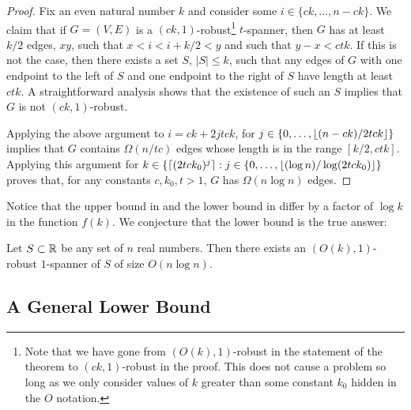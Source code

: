 \documentclass{patmorin}
\begin{document}
\begin{proof}
Fix an even natural number $k$ and consider some $i\in\{ck,\ldots,n-ck\}$.
We claim that if $G=(V,E)$ is a $(ck,1)$-robust\footnote{Note that we
have gone from $(O(k),1)$-robust in the statement of the theorem to
$(ck,1)$-robust in the proof.  This does not cause a problem so long
as we only consider values of $k$ greater than some constant $k_0$
hidden in the $O$ notation.} $t$-spanner, then $G$ has at least $k/2$
edges, $xy$, such that $x < i < i+k/2 < y$ and such that $y-x < ctk$.
If this is not the case, then there exists a set $S$, $|S|\le k$,
such that any edges of $G$ with one endpoint to the left of $S$
and one endpoint to the right of $S$ have length at least $ctk$.
A straightforward analysis shows that the existence of such an $S$
implies that $G$ is not $(ck,1)$-robust.

Applying the above argument to $i=ck+2jtck$, for
$j\in\{0,\ldots,{\lfloor (n-ck)/2tck \rfloor}\}$ implies that $G$ contains
$\Omega(n/tc)$ edges whose length is in the range $[k/2,ctk]$.  Applying
this argument for $k\in\{{\lceil (2tck_0)^{j} \rceil} : j\in\{0,\ldots,{\lfloor (\log
n)/\log(2tck_0) \rfloor}\}$ proves that, for any constants $c,k_0,t>1$, $G$
has $\Omega(n\log n)$ edges.
\end{proof}

Notice that the upper bound in  and the lower bound
in  differ by a factor of $\log k$ in the
function $f(k)$.  We conjecture that the lower bound is the true answer:

\begin{conj}
Let $S\subset \mathbb{R}$ be any set of $n$ real numbers.  Then there exists an
$(O(k),1)$-robust $1$-spanner of $S$ of size $O(n\log n)$.
\end{conj}

\subsection{A General Lower Bound}
\end{document}
